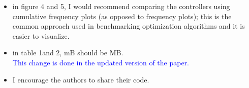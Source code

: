 \documentclass[xcolor=dvipsnames, 11pt]{article}
\newcommand{\reply}[1]{\textcolor{blue}{#1}}
\begin{document}
\begin{itemize}
  \item in figure 4 and 5, I would recommend comparing the controllers using cumulative frequency plots (as opposed to frequency plots); this is the common approach used in benchmarking optimization algorithms and it is easier to visualize.

  \item in table 1and 2, mB should be MB. \\
  \reply{This change is done in the updated version of the paper.}

  \item I encourage the authors to share their code.

\end{itemize}
\end{document}
